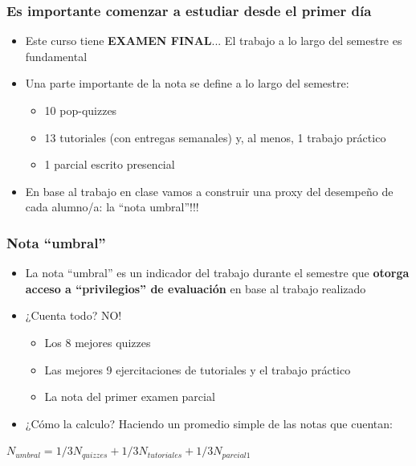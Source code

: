 \documentclass{beamer}
\begin{document}
\begin{frame}
\frametitle{Es importante comenzar a estudiar desde el primer día}
\begin{itemize}
    \item Este curso tiene \textbf{EXAMEN FINAL}...
    \Item El trabajo a lo largo del semestre es fundamental
    \item Una parte importante de la nota se define a lo largo del semestre:
        \begin{itemize}
            \item 10 pop-quizzes
            \item 13 tutoriales (con entregas semanales) y, al menos, 1 trabajo práctico
            \item 1 parcial escrito presencial 
        \end{itemize}
    \item En base al trabajo en clase vamos a construir una proxy del desempeño de cada alumno/a: la ``nota umbral''!!!
\end{itemize}
\end{frame}

\begin{frame}
\frametitle{Nota ``umbral''}
\begin{itemize}
    \item La nota ``umbral'' es un indicador del trabajo durante el semestre que \textbf{otorga acceso a ``privilegios'' de evaluación} en base al trabajo realizado
    \item ¿Cuenta todo? NO!
        \begin{itemize}
            \item Los 8 mejores quizzes
            \item Las mejores 9 ejercitaciones de tutoriales y el trabajo práctico
            \item La nota del primer examen parcial
        \end{itemize}
    \item ¿Cómo la calculo? Haciendo un promedio simple de las notas que cuentan:
    \end{itemize}
    
\begin{center}
 $N_{umbral}=1/3N_{quizzes}+1/3N_{tutoriales}+1/3N_{parcial 1}$   
 
\end{center}    
\end{frame}
\end{document}
